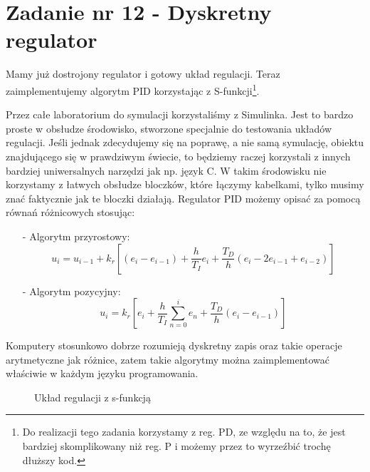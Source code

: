 \documentclass[11 pt]{article}
\begin{document}
\newpage

\setcounter{section}{12}
\setcounter{figure}{0}
\section*{Zadanie nr 12 - Dyskretny regulator}

Mamy już dostrojony regulator i gotowy układ regulacji. Teraz zaimplementujemy algorytm PID korzystając z S-funkcji\footnote{Do realizacji tego zadania korzystamy z reg. PD, ze względu na to, że jest bardziej skomplikowany niż reg. P i możemy przez to wyrzeźbić trochę dłuższy kod.}.

Przez całe laboratorium do symulacji korzystaliśmy z Simulinka. Jest to bardzo proste w obsłudze środowisko, stworzone specjalnie do testowania układów regulacji. Jeśli jednak zdecydujemy się na poprawę, a nie samą symulację, obiektu znajdującego się w prawdziwym świecie, to będziemy raczej korzystali z innych bardziej uniwersalnych narzędzi jak np. język C. W takim środowisku nie korzystamy z łatwych obsłudze bloczków, które łączymy kabelkami, tylko musimy znać faktycznie jak te bloczki działają. Regulator PID możemy opisać za pomocą równań różnicowych stosując:

\begin{itemize}
\item[-] Algorytm przyrostowy:
\begin{equation*}
u_i = u_{i-1} + k_r \left[ \left( e_i - e_{i-1} \right) + \frac{h}{T_I}e_i + \frac{T_D}{h} \left(e_i - 2e_{i-1} + e_{i-2} \right) \right]
\end{equation*}

\item[-] Algorytm pozycyjny:
\begin{equation*}
u_i = k_r \left[ e_i + \frac{h}{T_I} \sum^i_{n = 0}e_n + \frac{T_D}{h} \left( e_i - e_{i-1} \right) \right]
\end{equation*}
\end{itemize}

Komputery stosunkowo dobrze rozumieją dyskretny zapis oraz takie operacje arytmetyczne jak różnice, zatem takie algorytmy można zaimplementować właściwie w każdym języku programowania.

\begin{figure}[h!]
	\centerline{
	}
	\caption{Układ regulacji z s-funkcją}
\end{figure}
\end{document}
